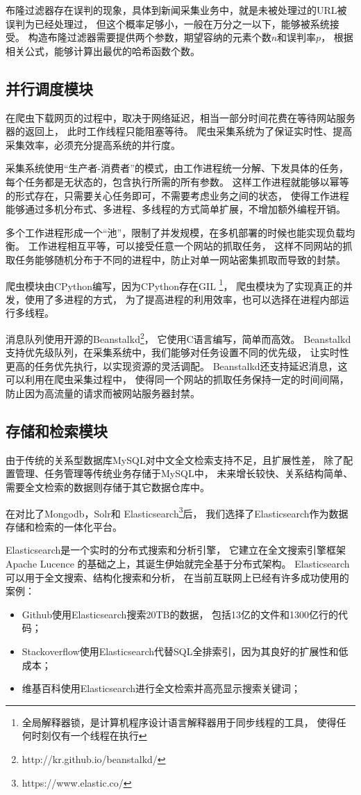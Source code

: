 布隆过滤器存在误判的现象，具体到新闻采集业务中，就是未被处理过的URL被误判为已经处理过，
但这个概率足够小，一般在万分之一以下，能够被系统接受。
构造布隆过滤器需要提供两个参数，期望容纳的元素个数$n$和误判率$p$，
根据相关公式，能够计算出最优的哈希函数个数。

\subsection{并行调度模块}
在爬虫下载网页的过程中，取决于网络延迟，相当一部分时间花费在等待网站服务器的返回上，
此时工作线程只能阻塞等待。
爬虫采集系统为了保证实时性、提高采集效率，必须充分提高系统的并行度。

采集系统使用“生产者-消费者”的模式，由工作进程统一分解、下发具体的任务，
每个任务都是无状态的，包含执行所需的所有参数。
这样工作进程就能够以幂等的形式存在，只需要关心任务即可，不需要考虑业务之间的状态，
使得工作进程能够通过多机分布式、多进程、多线程的方式简单扩展，不增加额外编程开销。

多个工作进程形成一个“池”，限制了并发规模，在多机部署的时候也能实现负载均衡。
工作进程相互平等，可以接受任意一个网站的抓取任务，
这样不同网站的抓取任务能够随机分布于不同的进程中，防止对单一网站密集抓取而导致的封禁。

爬虫模块由CPython编写，因为CPython存在GIL
\footnote{全局解释器锁，是计算机程序设计语言解释器用于同步线程的工具，
使得任何时刻仅有一个线程在执行}，
爬虫模块为了实现真正的并发，使用了多进程的方式，
为了提高进程的利用效率，也可以选择在进程内部运行多线程。

消息队列使用开源的Beanstalkd\footnote{http://kr.github.io/beanstalkd/}，
它使用C语言编写，简单而高效。
Beanstalkd支持优先级队列，在采集系统中，我们能够对任务设置不同的优先级，
让实时性更高的任务优先执行，以实现资源的灵活调配。
Beanstalkd还支持延迟消息，这可以利用在爬虫采集过程中，
使得同一个网站的抓取任务保持一定的时间间隔，
防止因为高流量的请求而被网站服务器封禁。

\subsection{存储和检索模块}
由于传统的关系型数据库MySQL对中文全文检索支持不足，且扩展性差，
除了配置管理、任务管理等传统业务存储于MySQL中，
未来增长较快、关系结构简单、需要全文检索的数据则存储于其它数据仓库中。

在对比了Mongodb，Solr和
Elasticsearch\footnote{https://www.elastic.co/}后，
我们选择了Elasticsearch作为数据存储和检索的一体化平台。

Elasticsearch是一个实时的分布式搜索和分析引擎，
它建立在全文搜索引擎框架Apache Lucence
的基础之上，其诞生伊始就完全基于分布式架构。
Elasticsearch可以用于全文搜索、结构化搜索和分析，
在当前互联网上已经有许多成功使用的案例：
\begin{itemize}
\item Github使用Elasticsearch搜索20TB的数据，
包括13亿的文件和1300亿行的代码；
\item Stackoverflow使用Elasticsearch代替SQL全排索引，因为其良好的扩展性和低成本；
\item 维基百科使用Elasticsearch进行全文检索并高亮显示搜索关键词；
\end{itemize}

